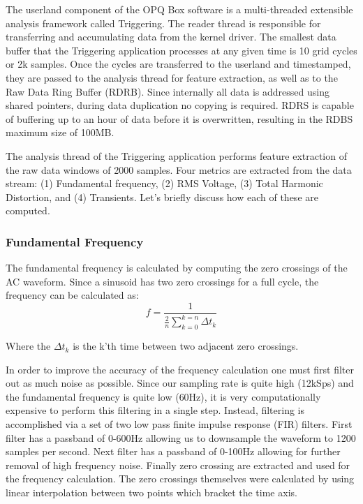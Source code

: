 The userland component of the OPQ Box software is a multi-threaded extensible analysis framework called Triggering.
The reader thread is responsible for transferring and accumulating data from the kernel driver.
The smallest data buffer that the Triggering application processes at any given time is 10 grid cycles or 2k samples.
Once the cycles are transferred to the userland and timestamped, they are passed to the analysis thread for feature extraction, as well as to the Raw Data Ring Buffer (RDRB).
Since internally all data is addressed using shared pointers, during data duplication no copying is required.
RDRS is capable of buffering up to an hour of data before it is overwritten, resulting in the RDBS maximum size of 100MB.

The analysis thread of the Triggering application performs feature extraction of the raw data windows of 2000 samples.
Four metrics are extracted from the data stream: (1) Fundamental frequency, (2) RMS Voltage, (3) Total Harmonic Distortion, and (4) Transients. Let's briefly discuss how each of these are computed.

\subsubsection{Fundamental Frequency}\label{subsec:fundamental-frequency}

The fundamental frequency is calculated by computing the zero crossings of the AC waveform.
Since a sinusoid has two zero crossings for a full cycle, the frequency can be calculated as:
\begin{equation} \label{eq:1}
 f = \frac{1}{\frac{2}{n}\sum\limits_{k=0}^{k=n}{\Delta t_{k}}}
\end{equation}

Where the $\Delta t_{k}$ is the k'th time between two adjacent zero crossings.

In order to improve the accuracy of the frequency calculation one must first filter out as much noise as possible.
Since our sampling rate is quite high (12kSps) and the fundamental frequency is quite low (60Hz), it is very computationally expensive to perform this filtering in a single step.
Instead, filtering is accomplished via a set of two low pass finite impulse response (FIR) filters.
First filter has a passband of 0-600Hz allowing us to downsample the waveform to 1200 samples per second.
Next filter has a passband of 0-100Hz allowing for further removal of high frequency noise.
Finally zero crossing are extracted and used for the frequency calculation.
The zero crossings themselves were calculated by using linear interpolation between two points which bracket the time axis.

